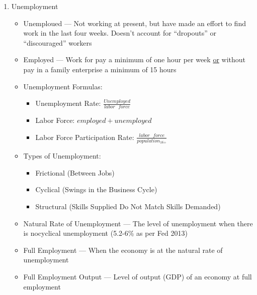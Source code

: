 \documentclass[12pt]{article}
\begin{document}
\begin{enumerate}
\begin{itemize}
    \end{itemize}

  \item Unemployment

    \begin{itemize}

      \item Unemploued — Not working at present, but have made an effort to find work in the last four weeks. Doesn't account for “dropouts” or “discouraged” workers

      \item Employed — Work for pay a minimum of one hour per week \underline{or} without pay in a family enterprise a minimum of 15 hours

      \item Unemployment Formulas:

        \begin{itemize}

          \item Unemployment Rate: $\frac{Unemployed}{labor\text{ }force}$

          \item Labor Force: $employed + unemployed$

          \item Labor Force Participation Rate: $\frac{labor\text{ }force}{population_{\text{16+}}}$

        \end{itemize}

      \item Types of Unemployment:

        \begin{itemize}

          \item Frictional (Between Jobs)

          \item Cyclical (Swings in the Business Cycle)

          \item Structural (Skills Supplied Do Not Match Skills Demanded)

        \end{itemize}

      \item Natural Rate of Unemployment — The level of unemployment when there is nocyclical unemployment (5.2-6\% as per Fed 2013)

      \item Full Employment — When the economy is at the natural rate of unemployment

      \item Full Employment Output — Level of output (GDP) of an economy at full employment

    \end{itemize}

\end{enumerate}
\end{document}
